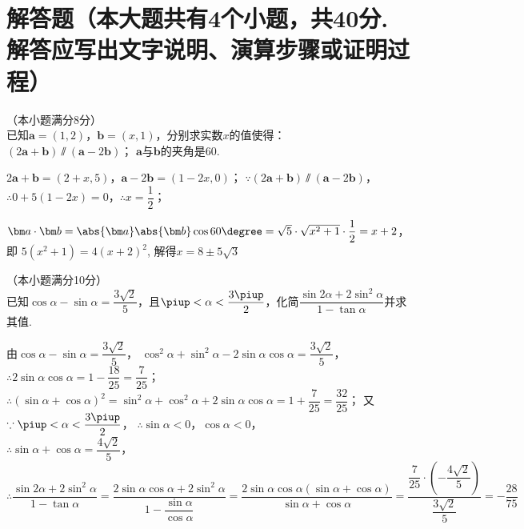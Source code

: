 \section{解答题（本大题共有4个小题，共40分. 解答应写出文字说明、演算步骤或证明过程）}
  \item
    （本小题满分8分）\\
    已知$\bm a=(1,2)$，$\bm b=(x,1)$，分别求实数$x$的值使得：\\
     $(2\bm a+\bm b)\varparallel(\bm a-2\bm b)$；
     $\bm a$与$\bm b$的夹角是60\degree.
    \begin{answer}
       $2\bm a+\bm b=(2+x,5)$，$\bm a-2\bm b=(1-2x,0)$；
        $\because (2\bm a+\bm b)\varparallel(\bm a-2\bm b)$，
        $\therefore 0+5(1-2x)=0$，$\therefore x=\dfrac12$；\par
       $\bm a\cdot\bm b
        =\abs{\bm a}\abs{\bm b}\cos{60\degree}
        =\sqrt5\cdot\sqrt{x^2+1}\cdot\dfrac12=x+2$，即
        $5(x^2+1)=4(x+2)^2$,
        解得$x=8\pm 5\sqrt3$
    \end{answer}
  \vspace{4em}
  \item
    （本小题满分10分）\\
    已知$\cos\alpha-\sin\alpha=\dfrac{3\sqrt2}5$，且$\piup<\alpha<\dfrac{3\piup}2$，化简$\dfrac{\sin{2\alpha}+2\sin^2\alpha}{1-\tan\alpha}$并求其值.
    \begin{answer}
      由$\cos\alpha-\sin\alpha=\dfrac{3\sqrt2}5$，
      $\cos^2\alpha+\sin^2\alpha-2\sin\alpha\cos\alpha=\dfrac{3\sqrt2}{5}$，\\
      $\therefore 2\sin\alpha\cos\alpha=1-\dfrac{18}{25}=\dfrac7{25}$；\\
      $\therefore (\sin\alpha+\cos\alpha)^2=\sin^2\alpha+\cos^2\alpha+2\sin\alpha\cos\alpha
      =1+\dfrac7{25}=\dfrac{32}{25}$；
      又$\because \piup<\alpha<\dfrac{3\piup}2$，
      $\therefore \sin\alpha<0$，$\cos\alpha<0$，\\
      $\therefore \sin\alpha+\cos\alpha=\dfrac{4\sqrt2}5$，\\
      $\therefore \dfrac{\sin{2\alpha}+2\sin^2\alpha}{1-\tan\alpha}
      =\dfrac{2\sin\alpha\cos\alpha+2\sin^2\alpha}{1-\dfrac{\sin\alpha}{\cos\alpha}}
      =\dfrac{2\sin\alpha\cos\alpha(\sin\alpha+\cos\alpha)}{\sin\alpha+\cos\alpha}
      =\dfrac{\dfrac7{25}\cdot(-\dfrac{4\sqrt2}{5})}{\dfrac{3\sqrt2}{5}}
      =-\dfrac{28}{75}$
    \end{answer}
  \vspace{4em}
  \item

